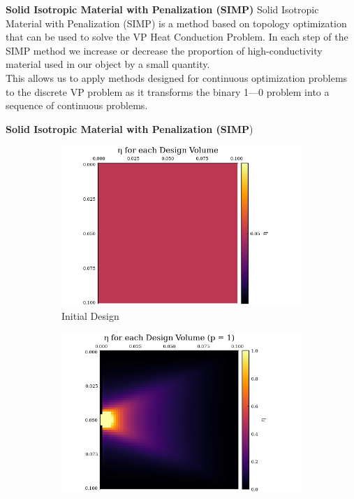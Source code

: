 \documentclass[final]{beamer}
\begin{document}
\begin{frame}{\textbf{Solid Isotropic Material with Penalization (SIMP)}}
	Solid Isotropic Material with Penalization (SIMP) is a method based on topology optimization that can be used to solve the VP Heat Conduction Problem.\vfill\pause
	In each step of the SIMP method we {\color{tiananmen}increase or decrease the proportion of high-conductivity material} used in our object by a small quantity.\\\vfill This allows us to apply methods designed for continuous optimization problems to the discrete VP problem as it {\color{tiananmen}transforms the binary 1---0 problem into a sequence of continuous problems}.
\end{frame}

\begin{frame}{\textbf{Solid Isotropic Material with Penalization (SIMP})}
	\begin{figure}
		\begin{subfigure}{0.45\linewidth}
			\includegraphics[width=\linewidth]{60x60-start-p=19-3iters.png}
			\caption{Initial Design}
		\end{subfigure}
		\begin{subfigure}{0.45\linewidth}
			\includegraphics[width=\linewidth]{60x60_1p.png}

\end{subfigure}
\end{figure}
\end{frame}
\end{document}
